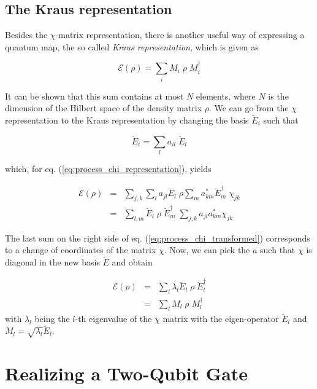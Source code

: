 \subsection{The Kraus representation}

Besides the $\chi$-matrix representation, there is another useful way of expressing a quantum map, the so called {\it Kraus representation}, which is given as

\begin{equation}
 \mathcal{E}(\rho) = \sum\limits_i M_i \; \rho \; M_i^\dagger \label{eq:process_kraus_representation}
\end{equation}

It can be shown \citep{haroche_exploring_2006} that this sum contains at most $N$ elements, where $N$ is the dimension of the Hilbert space of the density matrix $\rho$. We can go from the $\chi$ representation to the Kraus representation by changing the basis $\tilde{E}_i$ such that

\begin{equation}
	\tilde{E}_i = \sum\limits_l a_{il}\; \breve{E}_l
\end{equation}

which, for eq. (\ref{eq:process_chi_representation}), yields

\begin{eqnarray}
 \mathcal{E}(\rho) & = & \sum\limits_{j,k} \sum\limits_l a_{jl} \breve{E}_l \; \rho \sum\limits_m a_{km}^* \breve{E}_m^\dagger \; \chi_{jk} \\
 & = & \sum\limits_{l,m}  \breve{E}_l \; \rho \; \breve{E}_m^\dagger \; \sum\limits_{j,k} a_{jl} a_{km}^* \chi_{jk} \label{eq:process_chi_transformed}
\end{eqnarray}

The last sum on the right side of eq. (\ref{eq:process_chi_transformed}) corresponds to a change of coordinates of the matrix $\chi$. Now, we can pick the $a$ such that $\chi$ is diagonal in the new basis $\breve{E}$ and obtain

\begin{eqnarray}
 \mathcal{E}(\rho) & = &  \sum\limits_{l} \lambda_l \breve{E}_l \; \rho \; \breve{E}_l^\dagger \\
& = &  \sum\limits_{l} M_l \; \rho \; M_l^\dagger
\end{eqnarray}
with $\lambda_l$ being the $l$-th eigenvalue of the $\chi$ matrix with the eigen-operator $\breve{E}_l$ and $M_{l} = \sqrt{\lambda_l} \breve{E}_l$.


\section{Realizing a Two-Qubit Gate}

